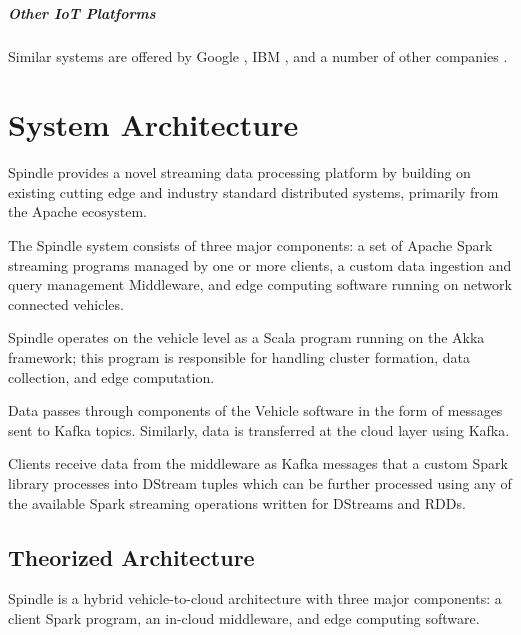 \documentclass{thesis}
\begin{document}
        \paragraph{Other IoT Platforms}
            Similar systems are offered by Google \cite{google:iot}, IBM \cite{ibm:iot}, and a number of other companies
            \cite{forbes:iot}.

\chapter{System Architecture}
    Spindle provides a novel streaming data processing platform by building on
    existing cutting edge and industry standard distributed systems, primarily
    from the Apache ecosystem. 

    The Spindle system consists of three major components: a set of Apache Spark %
    streaming programs managed by one or more clients, a custom data ingestion and
    query management Middleware, and edge computing software running on network
    connected vehicles.
    
    Spindle operates on the vehicle level as a Scala
    \cite{scala} program running on the Akka \cite{akka} framework; this program
    is responsible for handling cluster formation, data collection, and edge
    computation.

    Data passes through components of the Vehicle software in the form of 
    messages sent to Kafka \cite{kafka} topics. Similarly, data is transferred
    at the cloud layer using Kafka.

    Clients receive data from the middleware as Kafka messages that a custom Spark \cite{spark}
    library processes into DStream tuples which can be further processed using any of the available
    Spark streaming operations written for DStreams and RDDs.

\section{Theorized Architecture}
    Spindle is a hybrid vehicle-to-cloud architecture with three major components: a client Spark program,
    an in-cloud middleware, and edge computing software.
\end{document}
